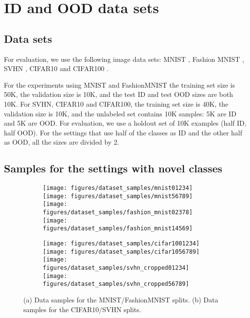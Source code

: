 \vspace{-0.1cm}
\section{ID and OOD data sets}
\label{sec:appendix_datasets}
\vspace{-0.2cm}

\subsection{Data sets}

For evaluation, we use the following image data sets: MNIST \citep{mnist},
Fashion MNIST \citep{fashion}, SVHN \citep{svhn}, CIFAR10 and CIFAR100
\citep{cifar}.

For the experiments using MNIST and FashionMNIST the training set size is 50K,
the validation size is 10K, and the test ID and test OOD sizes are both 10K.
For SVHN, CIFAR10 and CIFAR100, the training set size is 40K, the validation
size is 10K, and the unlabeled set contains 10K samples: 5K are ID and 5K are
OOD. For evaluation, we use a holdout set of 10K examples (half ID, half OOD).
For the settings that use half of the classes as ID and the other half as OOD,
all the sizes are divided by 2.

\vspace{-0.2cm}
\subsection{Samples for the settings with novel classes}

\vspace{-0.2cm}
\begin{figure}[H]
  \centering
  \begin{subfigure}[b]{0.4\textwidth}
     \centering

    \texttt{[image: figures/dataset\_samples/mnist01234]}
    \texttt{[image: figures/dataset\_samples/mnist56789]}
    \texttt{[image: figures/dataset\_samples/fashion\_mnist02378]}
    \texttt{[image: figures/dataset\_samples/fashion\_mnist14569]}

     \caption{}
  \end{subfigure}
  \hfill
  \begin{subfigure}[b]{0.4\textwidth}
     \centering

    \texttt{[image: figures/dataset\_samples/cifar1001234]}
    \texttt{[image: figures/dataset\_samples/cifar1056789]}
    \texttt{[image: figures/dataset\_samples/svhn\_cropped01234]}
    \texttt{[image: figures/dataset\_samples/svhn\_cropped56789]}

     \caption{}
  \end{subfigure}

  \caption{(a) Data samples for the MNIST/FashionMNIST splits. (b) Data samples for the CIFAR10/SVHN splits.}
  \label{fig:data_samples_mnist_splits}

\end{figure}







